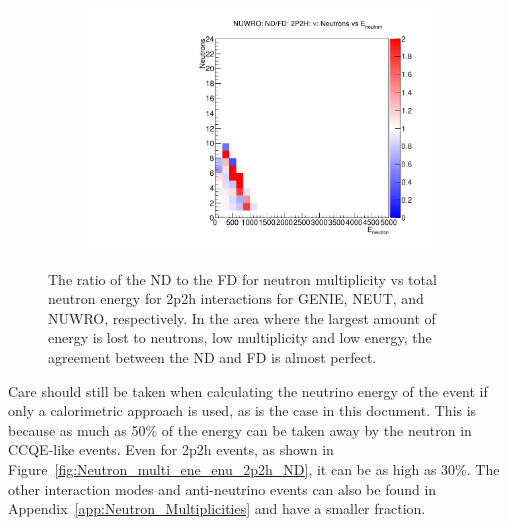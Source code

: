 \documentclass[12pt]{article}
\begin{document}
\begin{figure}
\begin{subfigure}[b]{0.32\textwidth}
  \includegraphics[width=\textwidth]{nneutrons_v_total_ene/Nneutrons_Total_ENe_2p2h_NUWRO_ND_FD_numu_norm.pdf}
\end{subfigure}
\caption{The ratio of the ND to the FD for neutron multiplicity vs total neutron energy for 2p2h interactions for GENIE, NEUT, and NUWRO, respectively.  In the area where the largest amount of energy is lost to neutrons, low multiplicity and low energy, the agreement between the ND and FD is almost perfect.} 
\label{fig:Neutron_multi_2p2h_ND_FD}
\end{figure}

Care should still be taken when calculating the neutrino energy of the event if only a calorimetric approach is used, as is the case in this document.
This is because as much as 50\% of the energy can be taken away by the neutron in CCQE-like events.
Even for 2p2h events, as shown in Figure~\ref{fig:Neutron_multi_ene_enu_2p2h_ND}, it can be as high as 30\%.
The other interaction modes and anti-neutrino events can also be found in Appendix~\ref{app:Neutron_Multiplicities} and have a smaller fraction.
\end{document}
